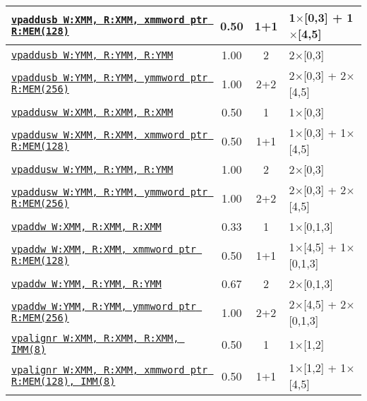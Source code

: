 \documentclass[a4paper,english,fontsize=9]{scrartcl}
\begin{document}
\begin{longtable}{p{}ccL{.25\textwidth}}
  \midrule
  \texttt{\href{https://felixcloutier.com/x86/PADDUSB:PADDUSW.html}{vpaddusb W:XMM, R:XMM, xmmword ptr R:MEM(128)}} & 0.50 & 1+1 & 1\(\times\)[0,3] + 1\(\times\)[4,5] \\
  \midrule
  \texttt{\href{https://felixcloutier.com/x86/PADDUSB:PADDUSW.html}{vpaddusb W:YMM, R:YMM, R:YMM}} & 1.00 & 2 & 2\(\times\)[0,3] \\
  \midrule
  \texttt{\href{https://felixcloutier.com/x86/PADDUSB:PADDUSW.html}{vpaddusb W:YMM, R:YMM, ymmword ptr R:MEM(256)}} & 1.00 & 2+2 & 2\(\times\)[0,3] + 2\(\times\)[4,5] \\
  \midrule
  \texttt{\href{https://felixcloutier.com/x86/PADDUSB:PADDUSW.html}{vpaddusw W:XMM, R:XMM, R:XMM}} & 0.50 & 1 & 1\(\times\)[0,3] \\
  \midrule
  \texttt{\href{https://felixcloutier.com/x86/PADDUSB:PADDUSW.html}{vpaddusw W:XMM, R:XMM, xmmword ptr R:MEM(128)}} & 0.50 & 1+1 & 1\(\times\)[0,3] + 1\(\times\)[4,5] \\
  \midrule
  \texttt{\href{https://felixcloutier.com/x86/PADDUSB:PADDUSW.html}{vpaddusw W:YMM, R:YMM, R:YMM}} & 1.00 & 2 & 2\(\times\)[0,3] \\
  \midrule
  \texttt{\href{https://felixcloutier.com/x86/PADDUSB:PADDUSW.html}{vpaddusw W:YMM, R:YMM, ymmword ptr R:MEM(256)}} & 1.00 & 2+2 & 2\(\times\)[0,3] + 2\(\times\)[4,5] \\
  \midrule
  \texttt{\href{https://felixcloutier.com/x86/PADDB:PADDW:PADDD:PADDQ.html}{vpaddw W:XMM, R:XMM, R:XMM}} & 0.33 & 1 & 1\(\times\)[0,1,3] \\
  \midrule
  \texttt{\href{https://felixcloutier.com/x86/PADDB:PADDW:PADDD:PADDQ.html}{vpaddw W:XMM, R:XMM, xmmword ptr R:MEM(128)}} & 0.50 & 1+1 & 1\(\times\)[4,5] + 1\(\times\)[0,1,3] \\
  \midrule
  \texttt{\href{https://felixcloutier.com/x86/PADDB:PADDW:PADDD:PADDQ.html}{vpaddw W:YMM, R:YMM, R:YMM}} & 0.67 & 2 & 2\(\times\)[0,1,3] \\
  \midrule
  \texttt{\href{https://felixcloutier.com/x86/PADDB:PADDW:PADDD:PADDQ.html}{vpaddw W:YMM, R:YMM, ymmword ptr R:MEM(256)}} & 1.00 & 2+2 & 2\(\times\)[4,5] + 2\(\times\)[0,1,3] \\
  \midrule
  \texttt{\href{https://felixcloutier.com/x86/PALIGNR.html}{vpalignr W:XMM, R:XMM, R:XMM, IMM(8)}} & 0.50 & 1 & 1\(\times\)[1,2] \\
  \midrule
  \texttt{\href{https://felixcloutier.com/x86/PALIGNR.html}{vpalignr W:XMM, R:XMM, xmmword ptr R:MEM(128), IMM(8)}} & 0.50 & 1+1 & 1\(\times\)[1,2] + 1\(\times\)[4,5] \\

\end{longtable}
\end{document}
